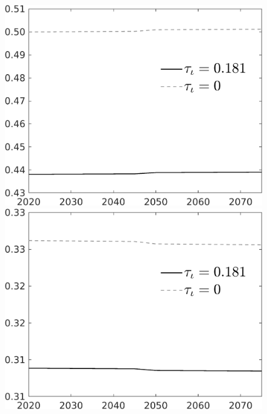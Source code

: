 \documentclass[12pt]{article}
\begin{document}
\begin{figure}[h!!]
\begin{minipage}[]{0.32\textwidth}
	\end{minipage}
	\begin{minipage}[]{0.32\textwidth}
		\includegraphics[width=1\textwidth]{../../codding_model/own_basedOnFried/optimalPol_010922_revision/figures/all_13Sept22/CompTauf_bytaul_Reg0_hh_spillover0_nsk0_xgr1_knspil0_sep0_LFlimit1_emsbase0_countec0_GovRev0_etaa0.79_lgd1.png}
	\end{minipage}	
	\begin{minipage}[]{0.32\textwidth}
		\includegraphics[width=1\textwidth]{../../codding_model/own_basedOnFried/optimalPol_010922_revision/figures/all_13Sept22/CompTauf_bytaul_Reg0_hl_spillover0_nsk0_xgr1_knspil0_sep0_LFlimit1_emsbase0_countec0_GovRev0_etaa0.79_lgd1.png}

\end{minipage}
\end{figure}
\end{document}
